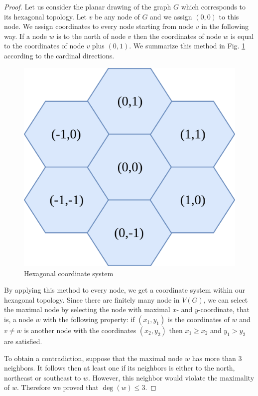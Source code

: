 \documentclass[a4paper, 12pt]{article}
\begin{document}
\begin{proof} Let us consider the planar drawing of the graph $G$ which corresponds to its hexagonal topology.
Let $v$ be any node of $G$ and we assign $(0,0)$ to this node. We assign coordinates to every node starting from node $v$ in the following way. If a node $w$ is to the north of node $v$ then the coordinates of node $w$ is equal to the coordinates of node $v$ plus $(0,1)$. We summarize this method in Fig. \ref{fig:assignment} according to the cardinal directions.
\begin{figure}[!h]
\centering
\includegraphics[scale=0.15]{figures/hexagonal-coordinate-system.png}
\caption{Hexagonal coordinate system}\label{fig:assignment}
\end{figure}
By applying this method to every node, we get a coordinate system within our hexagonal topology. Since there are finitely many node in $V(G)$, we can select the maximal node by selecting the node with maximal $x$- and $y$-coordinate, that is, a node $w$ with the following property: if $(x_1,y_1)$ is the coordinates of $w$ and $v \neq w$ is another node with the coordinates $(x_2,y_2)$ then $x_1 \geqslant x_2$ and $y_1 > y_2$ are satisfied.

To obtain a contradiction, suppose that the maximal node $w$ has more than 3 neighbors. It follows then at least one if its neighbors is either to the north, northeast or southeast to $w$. However, this neighbor would violate the maximality of $w$. Therefore we proved that $\deg(w) \leqslant 3$.
\end{proof}
\end{document}
